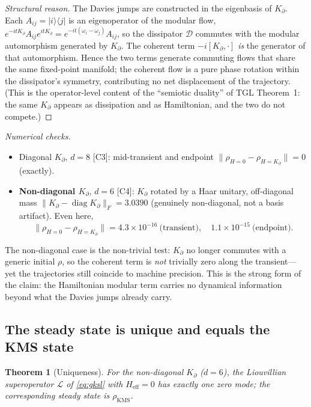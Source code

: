 \documentclass[11pt,a4paper]{article}
\theoremstyle{plain}
\newtheorem{theorem}{Theorem}
\theoremstyle{definition}
\newcommand{\Kp}{K_{\partial}}
\newcommand{\rhoKMS}{\rho_{\mathrm{KMS}}}
\newcommand{\Heff}{H_{\mathrm{eff}}}
\newcommand{\status}[1]{{\small\textsf{[#1]}}}
\begin{document}
\begin{proof}[Structural reason]
The Davies jumps are constructed in the eigenbasis of $\Kp$. Each
$A_{ij}=\lvert i\rangle\langle j\rvert$ is an eigenoperator of the modular flow,
$e^{-it\Kp}A_{ij}e^{it\Kp}=e^{-it(\omega_i-\omega_j)}A_{ij}$, so the dissipator
$\mathcal{D}$ commutes with the modular automorphism generated by $\Kp$. The
coherent term $-i[\Kp,\cdot]$ \emph{is} the generator of that automorphism.
Hence the two terms generate commuting flows that share the same fixed-point
manifold; the coherent flow is a pure phase rotation within the dissipator's
symmetry, contributing no net displacement of the trajectory. (This is the
operator-level content of the ``semiotic duality'' of TGL Theorem~1: the same
$\Kp$ appears as dissipation and as Hamiltonian, and the two do not compete.)
\end{proof}

\noindent\emph{Numerical checks.}
\begin{itemize}[leftmargin=1.4em]
\item Diagonal $\Kp$, $d=8$ \status{C3}: mid-transient and endpoint
  $\lVert\rho_{H=0}-\rho_{H=\Kp}\rVert = 0$ (exactly).
\item \textbf{Non-diagonal $\Kp$}, $d=6$ \status{C4}: $\Kp$ rotated by a Haar
  unitary, off-diagonal mass $\lVert\Kp-\operatorname{diag}\Kp\rVert_F=3.0390$
  (genuinely non-diagonal, not a basis artifact). Even here,
  \[
    \lVert\rho_{H=0}-\rho_{H=\Kp}\rVert
    = 4.3\times10^{-16}\ \text{(transient)},\quad
    1.1\times10^{-15}\ \text{(endpoint)} .
  \]
\end{itemize}
The non-diagonal case is the non-trivial test: $\Kp$ no longer commutes with a
generic initial $\rho$, so the coherent term is \emph{not} trivially zero along
the transient---yet the trajectories still coincide to machine precision. This
is the strong form of the claim: the Hamiltonian modular term carries no
dynamical information beyond what the Davies jumps already carry.

\subsection{The steady state is unique and equals the KMS state}

\begin{theorem}[Uniqueness]\label{thm:unique}
For the non-diagonal $\Kp$ ($d=6$), the Liouvillian superoperator
$\mathcal{L}$ of \eqref{eq:gksl} with $\Heff=0$ has exactly one zero mode; the
corresponding steady state is $\rhoKMS$.
\end{theorem}
\end{document}
